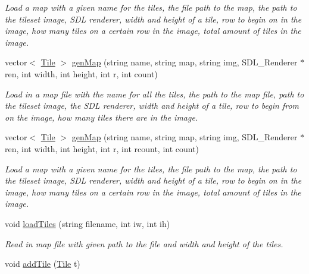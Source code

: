 \begin{DoxyCompactItemize}
\begin{DoxyCompactList}\small\item\em Load a map with a given name for the tiles, the file path to the map, the path to the tileset image, S\+DL renderer, width and height of a tile, row to begin on in the image, how many tiles on a certain row in the image, total amount of tiles in the image. \end{DoxyCompactList}\item 
vector$<$ \hyperlink{classTile}{Tile} $>$ \hyperlink{classTilesettmp_a14dba5cc61693a0c90d838680bb3c505}{gen\+Map} (string name, string map, string img, S\+D\+L\+\_\+\+Renderer $\ast$ren, int width, int height, int r, int count)\hypertarget{classTilesettmp_a14dba5cc61693a0c90d838680bb3c505}{}\label{classTilesettmp_a14dba5cc61693a0c90d838680bb3c505}

\begin{DoxyCompactList}\small\item\em Load in a map file with the name for all the tiles, the path to the map file, path to the tileset image, the S\+DL renderer, width and height of a tile, row to begin from on the image, how many tiles there are in the image. \end{DoxyCompactList}\item 
vector$<$ \hyperlink{classTile}{Tile} $>$ \hyperlink{classTilesettmp_af0d9685dd5121ba2b1d0f8b7a4fdd4fe}{gen\+Map} (string name, string map, string img, S\+D\+L\+\_\+\+Renderer $\ast$ren, int width, int height, int r, int rcount, int count)\hypertarget{classTilesettmp_af0d9685dd5121ba2b1d0f8b7a4fdd4fe}{}\label{classTilesettmp_af0d9685dd5121ba2b1d0f8b7a4fdd4fe}

\begin{DoxyCompactList}\small\item\em Load a map with a given name for the tiles, the file path to the map, the path to the tileset image, S\+DL renderer, width and height of a tile, row to begin on in the image, how many tiles on a certain row in the image, total amount of tiles in the image. \end{DoxyCompactList}\item 
void \hyperlink{classTilesettmp_a68961ddd3e263b124e47f9498e97f76a}{load\+Tiles} (string filename, int iw, int ih)\hypertarget{classTilesettmp_a68961ddd3e263b124e47f9498e97f76a}{}\label{classTilesettmp_a68961ddd3e263b124e47f9498e97f76a}

\begin{DoxyCompactList}\small\item\em Read in map file with given path to the file and width and height of the tiles. \end{DoxyCompactList}\item 
void \hyperlink{classTilesettmp_a9ff0f0e4bf438392a2f1fb48ffeae58f}{add\+Tile} (\hyperlink{classTile}{Tile} t)\hypertarget{classTilesettmp_a9ff0f0e4bf438392a2f1fb48ffeae58f}{}\label{classTilesettmp_a9ff0f0e4bf438392a2f1fb48ffeae58f}


\end{DoxyCompactItemize}
